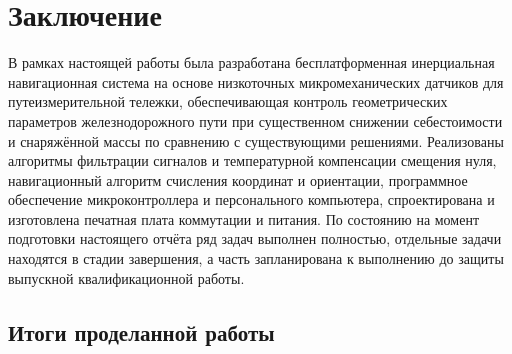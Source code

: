 \chapter{Заключение}

В рамках настоящей работы была разработана бесплатформенная инерциальная навигационная система на основе низкоточных микромеханических датчиков для путеизмерительной тележки, обеспечивающая контроль геометрических параметров железнодорожного пути при существенном снижении себестоимости и снаряжённой массы по сравнению с существующими решениями. Реализованы алгоритмы фильтрации сигналов и температурной компенсации смещения нуля, навигационный алгоритм счисления координат и ориентации, программное обеспечение микроконтроллера и персонального компьютера, спроектирована и изготовлена печатная плата коммутации и питания. По состоянию на момент подготовки настоящего отчёта ряд задач выполнен полностью, отдельные задачи находятся в стадии завершения, а часть запланирована к выполнению до защиты выпускной квалификационной работы.

\section*{Итоги проделанной работы}


